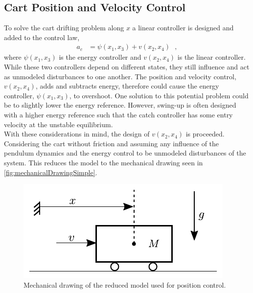 
\subsection{Cart Position and Velocity Control}
To solve the cart drifting problem along $x$ a linear controller is designed and added to the control law,
\begin{align}
  a_c &= \psi(x_1,x_3) + v(x_2,x_4) \ \ \ ,   \label{eq:combiControl} 
\end{align}
where $\psi(x_1,x_3)$ is the energy controller and $v(x_2,x_4)$ is the linear controller. While these two controllers depend on different states, they still influence and act as unmodeled disturbances to one another. The position and velocity control, $v(x_2,x_4)$, adds and subtracts energy, therefore could cause the energy controller, $\psi(x_1,x_3)$, to overshoot. One solution to this potential problem could be to slightly lower the energy reference. However, swing-up is often designed with a higher energy reference such that the catch controller has some entry velocity at the unstable equilibrium.\\
With these considerations in mind, the design of $v(x_2,x_4)$ is proceeded. Considering the cart without friction and assuming any influence of the pendulum dynamics and the energy control to be unmodeled disturbances of the system. This reduces the model to the mechanical drawing seen in \autoref{fig:mechanicalDrawingSimple}.
%
\begin{figure}[H]
  \includegraphics[width=.35\textwidth]{figures/mechanicalDrawingSimple}
  \caption{Mechanical drawing of the reduced model used for position control.}
  \label{fig:mechanicalDrawingSimple}
\end{figure}
